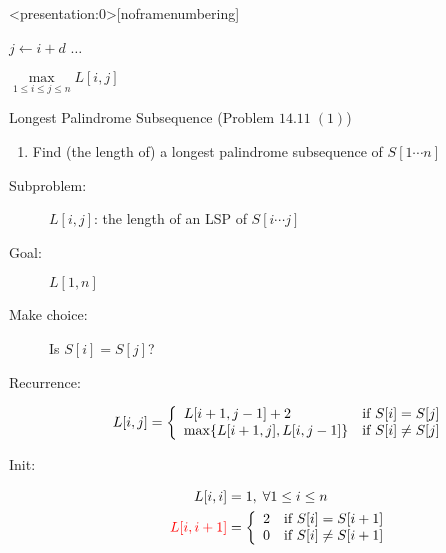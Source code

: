\begin{frame}<presentation:0>[noframenumbering]
  \centerline{}

  \pause
  \vspace{0.30cm}
  \begin{center}
    \begin{minipage}{0.50\textwidth}
      \begin{algorithmic}
	    \State $j \gets i + d$
		\State $\dots$
	  \EndFor
	\EndFor

	\State \Return $\max\limits_{1 \le i \le j \le n} L[i,j]$
      \end{algorithmic}
    \end{minipage}
  \end{center}
\end{frame}
\begin{frame}{}
  \begin{exampleblock}{Longest Palindrome Subsequence (Problem $14.11\; (1)$)}
    \begin{enumerate}[(1)]
      \item Find (the length of) a longest palindrome subsequence of $S[1 \cdots n]$
    \end{enumerate}
  \end{exampleblock}

  \begin{description}
	\item[Subproblem:] $L[i,j]$: the length of an LSP of $S[i \cdots j]$
	\item[Goal:] $L[1,n]$
	  \pause
	\item[Make choice:] Is $S[i] = S[j]$?
	\item[Recurrence:] 
	  \begin{displaymath}
		L[i,j] = \left\{ \begin{array}{ll}
		  L[i+1, j-1] + 2 & \text{if } S[i] = S[j]  \\
		  \max\{L[i+1,j], L[i,j-1]\} & \text{if } S[i] \neq S[j]
		\end{array} \right.
	  \end{displaymath}
	  \pause
	\item[Init:]
	  \begin{align*}
		L[i,i] &= 1, \; \forall 1 \le i \le n  \\
		\textcolor{red}{L[i,i+1]} &= \left\{ \begin{array}{ll}
		  2 & \text{if } S[i] = S[i+1]  \\
		  0 & \text{if } S[i] \neq S[i+1]
		  \end{array} \right.
	  \end{align*}
  \end{description}
\end{frame}
